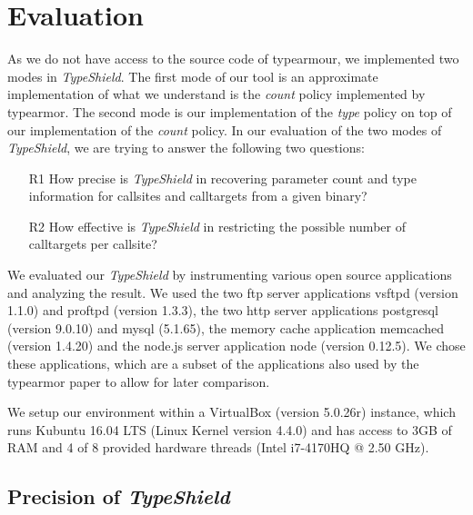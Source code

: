 \chapter{Evaluation}
\label{chapter:Evaluation}
As we do not have access to the source code of typearmour, we implemented two modes in \textit{TypeShield}. The first mode of our tool is an approximate implementation of what we understand is the \textit{count} policy implemented by typearmor. The second mode is our implementation of the \textit{type} policy on top of our implementation of the \textit{count} policy. In our evaluation of the two modes of \textit{TypeShield}, we are trying to answer the following two questions:
\begin{enumerate}

 \item[R1] How precise is \textit{TypeShield} in recovering parameter count and type information for callsites and calltargets from a given binary?

 \item[R2] How effective is \textit{TypeShield} in restricting the possible number of calltargets per callsite?

%
%

\end{enumerate}
We evaluated our \textit{TypeShield} by instrumenting various open source applications and analyzing the result. We used the two ftp server applications vsftpd (version 1.1.0) and proftpd (version 1.3.3), the two http server applications postgresql (version 9.0.10) and  mysql (5.1.65), the memory cache application memcached (version 1.4.20) and the node.js server application node (version 0.12.5). We chose these applications, which are a subset of the applications also used by the typearmor paper\cite{veen:typearmor} to allow for later comparison.

We setup our environment within a VirtualBox (version 5.0.26r) instance, which runs Kubuntu 16.04 LTS (Linux Kernel version 4.4.0) and has access to 3GB of RAM and 4 of 8 provided hardware threads (Intel i7-4170HQ @ 2.50 GHz).

\section{Precision of \textit{TypeShield}}
\label{section:typeshieldprecision}

